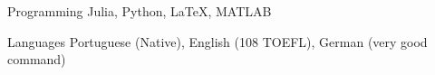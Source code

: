 

\begin{cvskills}

  \cvskill
    {Programming} %
    {Julia, Python, LaTeX, MATLAB} %

  \cvskill
    {Languages} %
    {Portuguese (Native), English (108 TOEFL), German (very good command)} %

\end{cvskills}
